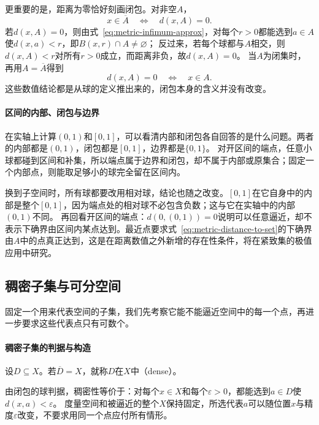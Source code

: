 更重要的是，距离为零恰好刻画闭包。对非空$A$，
\begin{equation}
\label{eq:metric-zero-distance-closure}
  x\in\overline A\quad\Longleftrightarrow\quad d(x,A)=0.
\end{equation}
若$d(x,A)=0$，则由式~\eqref{eq:metric-infimum-approx}，对每个$r>0$都能选到$a\in A$使$d(x,a)<r$，即$B(x,r)\cap A\neq\varnothing$；
反过来，若每个球都与$A$相交，则$d(x,A)<r$对所有$r>0$成立，而距离非负，故$d(x,A)=0$。
当$A$为闭集时，再用$A=\overline A$得到
\[
  d(x,A)=0\quad\Longleftrightarrow\quad x\in A.
\]
这些数值结论都是从球的定义推出来的，闭包本身的含义并没有改变。

\paragraph{区间的内部、闭包与边界}

在实轴上计算$(0,1)$和$[0,1]$，可以看清内部和闭包各自回答的是什么问题。两者的内部都是$(0,1)$，闭包都是$[0,1]$，边界都是$\{0,1\}$。
对开区间的端点，任意小球都碰到区间和补集，所以端点属于边界和闭包，却不属于内部或原集合；固定一个内部点，则能取足够小的球完全留在区间内。

换到子空间时，所有球都要改用相对球，结论也随之改变。$[0,1]$在它自身中的内部是整个$[0,1]$，因为端点处的相对球不必包含负数；这与它在实轴中的内部$(0,1)$不同。
再回看开区间的端点：$d(0,(0,1))=0$说明可以任意逼近，却不表示下确界由区间内某点达到。最近点要求式~\eqref{eq:metric-distance-to-set}的下确界由$A$中的点真正达到，这是在距离数值之外新增的存在性条件，将在紧致集的极值应用中研究。

\subsection{稠密子集与可分空间}
\label{sec:metric-countable-approximation}

固定一个用来代表空间的子集，我们先考察它能不能逼近空间中的每一个点，再进一步要求这些代表点只有可数个。

\paragraph{稠密子集的判据与构造}

\begin{definition}[稠密子集]
\label{def:metric-dense}
设$D\subseteq X$。若$\overline D=X$，就称$D$在$X$中（dense）。
\end{definition}

由闭包的球判据，稠密性等价于：对每个$x\in X$和每个$\varepsilon>0$，都能选到$a\in D$使$d(x,a)<\varepsilon$。
度量空间和被逼近的整个$X$保持固定，所选代表$a$可以随位置$x$与精度$\varepsilon$改变，不要求用同一个点应付所有情形。


